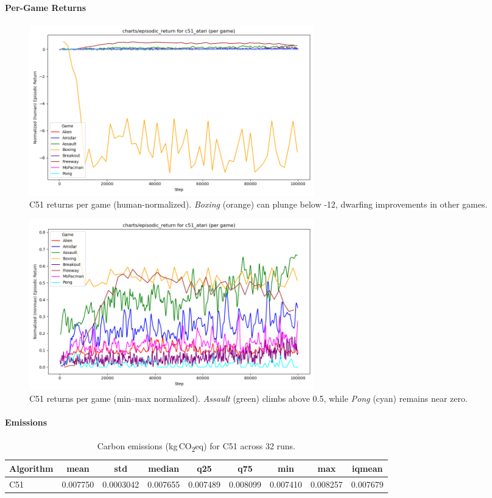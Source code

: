 \paragraph{Per-Game Returns}

\begin{figure}
	\centering
	\includegraphics[width=0.6\textwidth]{figures/c51/charts_episodic_return_per_game_human_c51_atari.png}
	\caption{C51 returns per game (human-normalized). 
		\emph{Boxing} (orange) can plunge below -12, dwarfing improvements in other games.}
	\label{fig:c51_return_pergame_human}
\end{figure}

\begin{figure}
	\centering
	\includegraphics[width=0.6\textwidth]{figures/c51/charts_episodic_return_per_game_minmax_c51_atari.png}
	\caption{C51 returns per game (min--max normalized). 
		\emph{Assault} (green) climbs above 0.5, while \emph{Pong} (cyan) remains near zero.}
	\label{fig:c51_return_pergame_minmax}
\end{figure}

\paragraph{Emissions}

\begin{table}
	\caption{Carbon emissions (kg\,CO\textsubscript{2}eq) for C51 across 32 runs.}
	\label{tab:c51_emissions}
	\centering
	\begin{tabular}{lcccccccc}
		\toprule
		\textbf{Algorithm} & \textbf{mean} & \textbf{std} & \textbf{median} & 
		\textbf{q25} & \textbf{q75} & \textbf{min} & \textbf{max} & \textbf{iqmean} \\
		\midrule
		C51 & 0.007750 & 0.0003042 & 0.007655 & 0.007489 & 0.008099 & 0.007410 & 0.008257 & 0.007679 \\
		\bottomrule
	\end{tabular}
\end{table}

